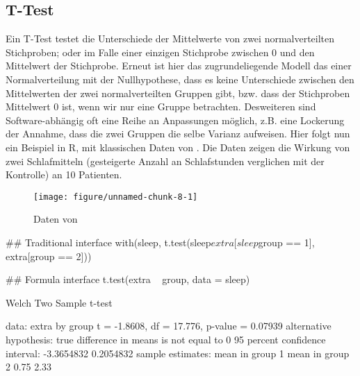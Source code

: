 \documentclass[a4paper,twoside]{tufte-book}\usepackage[]{graphicx}\usepackage[]{color}
\makeatletter
\def\maxwidth{ %
	\ifdim\Gin@nat@width>\linewidth
	\linewidth
	\else
	\Gin@nat@width
	\fi
}
\makeatother
\begin{document}
\subsection{T-Test}

Ein T-Test testet die Unterschiede der Mittelwerte von zwei normalverteilten Stichproben; oder im Falle einer einzigen Stichprobe zwischen 0 und den Mittelwert der Stichprobe. Erneut ist hier das zugrundeliegende Modell das einer Normalverteilung mit der Nullhypothese, dass es keine Unterschiede zwischen den Mittelwerten der zwei normalverteilten Gruppen gibt, bzw. dass der Stichproben Mittelwert 0 ist, wenn wir nur eine Gruppe betrachten. Desweiteren sind Software-abhängig oft eine Reihe an Anpassungen möglich, z.B. eine Lockerung der Annahme, dass die zwei Gruppen die selbe Varianz aufweisen. Hier folgt nun ein Beispiel in R, mit klassischen Daten von \citet{Student-probableerrormean-1908}. Die Daten zeigen die Wirkung von zwei Schlafmitteln (gesteigerte Anzahl an Schlafstunden verglichen mit der Kontrolle) an 10 Patienten. 

\begin{figure}[htbp]
\begin{center}
\begin{Schunk}

\texttt{[image: figure/unnamed-chunk-8-1]} \end{Schunk}
\caption{Daten von \citet{Student-probableerrormean-1908}}
\label{fig: Student Sleep Data}
\end{center}
\end{figure}

\begin{Schunk}
\begin{Sinput}
## Traditional interface
with(sleep, t.test(sleep$extra[sleep$group == 1], extra[group == 2]))
\end{Sinput}
\end{Schunk}

\begin{Schunk}
\begin{Sinput}
## Formula interface
t.test(extra ~ group, data = sleep)
\end{Sinput}
\begin{Soutput}

	Welch Two Sample t-test

data:  extra by group
t = -1.8608, df = 17.776, p-value = 0.07939
alternative hypothesis: true difference in means is not equal to 0
95 percent confidence interval:
 -3.3654832  0.2054832
sample estimates:
mean in group 1 mean in group 2 
           0.75            2.33 
\end{Soutput}
\end{Schunk}
\end{document}

